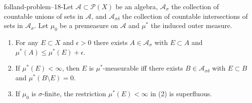 \begin{mystexercise}{}{folland-problem--18-}\label{Folland Problem (18)}\label{folland problem (18)}Let $\mathcal{A} \subset \mathcal{P}(X)$ be an algebra, $\mathcal{A}_\sigma$ the collection of countable unions of sets in $\mathcal{A}$, and $\mathcal{A}_{\sigma\delta}$ the collection of countable intersections of sets in $\mathcal{A}_\sigma$. Let $\mu_0$ be a premeasure on $\mathcal{A}$ and $\mu^*$ the induced outer measure.

\begin{enumerate}
\item For any $E \subset X$ and $\epsilon > 0$ there exists $A \in \mathcal{A}_\sigma$ with $E \subset A$ and $\mu^*(A) \le \mu^*(E) + \epsilon$.
\item If $\mu^*(E) < \infty$, then $E$ is $\mu^*$-measurable iff there exists $B \in \mathcal{A}_{\sigma\delta}$ with $E \subset B$ and $\mu^*(B \setminus E) = 0$.
\item If $\mu_0$ is $\sigma$-finite, the restriction $\mu^*(E) < \infty$ in (2) is superfluous.
\end{enumerate}

\end{mystexercise}
